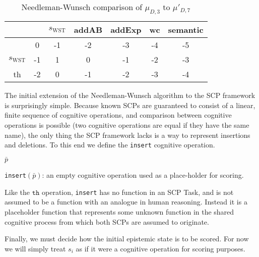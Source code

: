 \begin{table}
\begin{center}
\begin{tabular}{c | c c c c c c }
 & & $s_\text{WST}$ & addAB & addExp & wc & semantic\\
\hline
 & 0 & -1 & -2 & -3 & -4 & -5\\
$s_\text{WST}$ & -1 & 1 & 0 & -1 & -2 & -3\\
th & -2 & 0 & -1 & -2 & -3 & -4
\end{tabular}
\caption{Needleman-Wunsch comparison of $\mu_{D,3}$ to $\mu'_{D,7}$}
\label{tbl:compD3D7prime}
\end{center}
\end{table}

The initial extension of the Needleman-Wunsch algorithm to the SCP framework is surprisingly simple. Because known SCPs are guaranteed to consist of a linear, finite sequence of cognitive operations, and comparison between cognitive operations is possible (two cognitive operations are equal if they have the same name), the only thing the SCP framework lacks is a way to represent insertions and deletions. To this end we define the \texttt{insert} cognitive operation. 

\begin{algorithm}[H] 
\SetAlgoLined
{}
{
\Return $\bar{p}$
}

\caption{\texttt{insert}$(\bar{p})$: an empty cognitive operation used as a place-holder for scoring.}
\label{cogOp:insert}
\end{algorithm}

Like the $\texttt{th}$ operation, \texttt{insert} has no function in an SCP Task, and is not assumed to be a function with an analogue in human reasoning. Instead it is a placeholder function that represents some unknown function in the shared cognitive process from which both SCPs are assumed to originate.

Finally, we must decide how the initial epistemic state is to be scored. For now we will simply treat $s_i$ as if it were a cognitive operation for scoring purposes.

